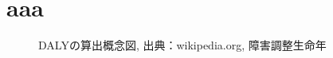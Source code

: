 \documentclass[a4j,11pt,mc]{jreport}
\begin{document}

\section{aaa}
\begin{figure}[h!]
	\begin{center}
			\caption{DALYの算出概念図, 出典：wikipedia.org, 障害調整生命年
		}
	\end{center}
\end{figure}












\newpage
\makeatletter
\renewcommand{\@biblabel}[1]{[#1]}
\makeatother



\end{document}
